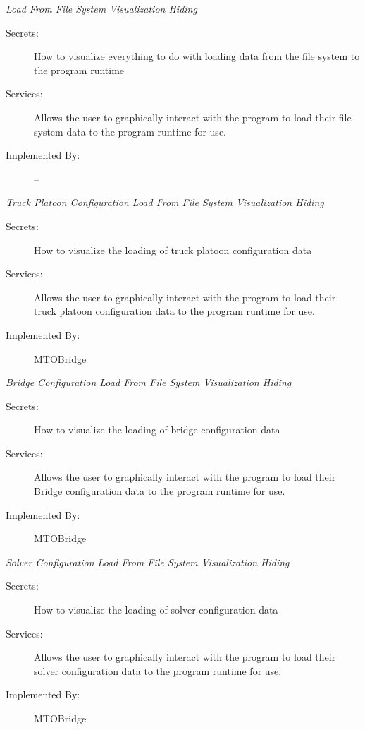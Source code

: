 \documentclass[12pt, titlepage]{article}
\begin{document}
     \hypertarget{LFFSVH}{\emph{{\large Load From File System Visualization Hiding}}}
    \begin{description}
        \item[Secrets:]How to visualize everything to do with loading data from the file system to the program runtime
        \item[Services:]Allows the user to graphically interact with the program to load their file system data to the program runtime for use.
        \item[Implemented By:] --\\
    \end{description}
     \hypertarget{TPCLFFSVH}{\emph{{\large Truck Platoon Configuration Load From File System Visualization Hiding}}}
    \begin{description}
        \item[Secrets:]How to visualize the loading of truck platoon configuration data
        \item[Services:]Allows the user to graphically interact with the program to load their truck platoon configuration data to the program runtime for use.
        \item[Implemented By:] MTOBridge\\
    \end{description}
     \hypertarget{BCLFFSVH}{\emph{{\large Bridge Configuration Load From File System Visualization Hiding}}}
    \begin{description}
        \item[Secrets:]How to visualize the loading of bridge configuration data
        \item[Services:]Allows the user to graphically interact with the program to load their Bridge configuration data to the program runtime for use.
        \item[Implemented By:] MTOBridge\\
    \end{description}
    \hypertarget{SCLFFSVH}{ \emph{{\large Solver Configuration Load From File System Visualization Hiding}}}
    \begin{description}
        \item[Secrets:]How to visualize the loading of solver configuration data
        \item[Services:]Allows the user to graphically interact with the program to load their solver configuration data to the program runtime for use.
        \item[Implemented By:] MTOBridge\\
    \end{description}
\end{document}
